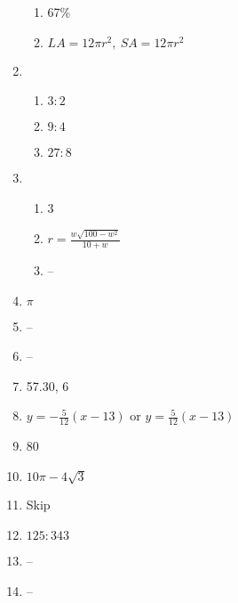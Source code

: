 \documentclass{article}
\begin{document}
\begin{enumerate}
	\begin{enumerate}
	
	\item 67\%
	
	\item $LA = 12 \pi r^2, \ SA = 12 \pi r^2$
	
	\end{enumerate}
	
\item

	\begin{enumerate}
	
	\item $3:2$
	
	\item $9:4$
	
	\item $27:8$
	
	\end{enumerate}
	
\item

	\begin{enumerate}
	
	\item 3
	
	\item $r = \frac{w \sqrt{100 - w^2}}{10 + w}$
	
	\item --
	
	\end{enumerate}
	
\item $\pi$

\item --

\item --

\item 57.30, 6

\item $y = -\frac{5}{12} (x - 13)$ or $y = \frac{5}{12} (x - 13)$

\item 80

\item $10 \pi - 4 \sqrt{3}$

\item Skip

\item $125 : 343$

\item --

\item --


\end{enumerate}
\end{document}
